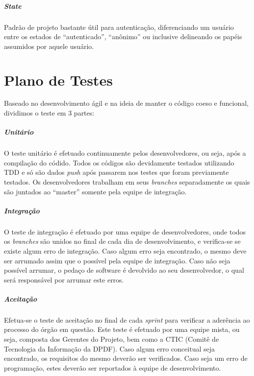 \documentclass[12pt,a4paper]{report}
\begin{document}
\paragraph{\textit{State}} Padrão de projeto bastante útil para autenticação, diferenciando um usuário entre os estados de ``autenticado'', ``anônimo'' ou inclusive delineando os papéis assumidos por aquele usuário.

\chapter{Plano de Testes}
Baseado no desenvolvimento ágil e na ideia de manter o código coeso e funcional, dividimos o teste em 3 partes:

\paragraph{Unitário} O teste unitário é efetuado continuamente pelos desenvolvedores, ou seja, após a compilação do códido. Todos os códigos são devidamente testados utilizando TDD e só são dados \textit{push} após passarem nos testes que foram previamente testados. Os desenvolvedores trabalham em seus \textit{branches} separadamente os quais são juntados ao ``master'' somente pela equipe de integração.

\paragraph{Integração} O teste de integração é efetuado por uma equipe de desenvolvedores, onde todos os \textit{branches} são unidos no final de cada dia de desenvolvimento, e verifica-se se existe algum erro de integração. Caso algum erro seja encontrado, o mesmo deve ser arrumado assim que o possível pela equipe de integração. Caso não seja possível arrumar, o pedaço de software é devolvido ao seu desenvolvedor, o qual será responsável por arrumar este erros.

\paragraph{Aceitação} Efetua-se o teste de aceitação no final de cada \textit{sprint} para verificar a aderência ao processo do órgão em questão. Este teste é efetuado por uma equipe mista, ou seja, composta dos Gerentes do Projeto, bem como a CTIC (Comitê de Tecnologia da Informação da DPDF). Caso algum erro conceitual seja encontrado, os requisitos do mesmo deverão ser verificados. Caso seja um erro de programação, estes deverão ser reportados à equipe de desenvolvimento.
\end{document}

